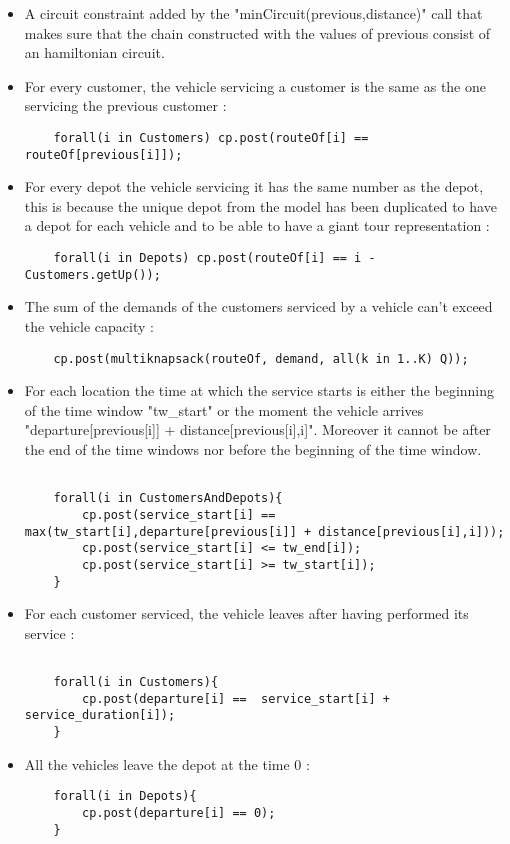 \documentclass{eplDoc}
\begin{document}
\begin{itemize}
	\item A circuit constraint added by the "minCircuit(previous,distance)" call that makes sure that the chain constructed with the values of previous consist of an hamiltonian circuit. 
	\item For every customer, the vehicle servicing a customer is the same as the one servicing the previous customer : 
	\begin{lstlisting}
	forall(i in Customers) cp.post(routeOf[i] == routeOf[previous[i]]);
	\end{lstlisting}
	\item For every depot the vehicle servicing it has the same number as the depot, this is because the unique depot from the model has been duplicated to have a depot for each vehicle and to be able to have a giant tour representation : 
	\begin{lstlisting}
	forall(i in Depots) cp.post(routeOf[i] == i - Customers.getUp());
	\end{lstlisting}
	\item The sum of the demands of the customers serviced by a vehicle can't exceed the vehicle capacity : 
	\begin{lstlisting}
	cp.post(multiknapsack(routeOf, demand, all(k in 1..K) Q));
	\end{lstlisting}
	\item For each location the time at which the service starts is either the beginning of the time window "tw\_start" or the moment the vehicle arrives "departure[previous[i]] + distance[previous[i],i]". Moreover it cannot be after the end of the time windows nor before the beginning of the time window. 
	\begin{lstlisting}
	
	forall(i in CustomersAndDepots){
		cp.post(service_start[i] == max(tw_start[i],departure[previous[i]] + distance[previous[i],i]));
		cp.post(service_start[i] <= tw_end[i]);
		cp.post(service_start[i] >= tw_start[i]);
	}
	\end{lstlisting}
	\item For each customer serviced, the vehicle leaves after having performed its service : 
	\begin{lstlisting}
	
	forall(i in Customers){
		cp.post(departure[i] ==  service_start[i] + service_duration[i]);
	}
	\end{lstlisting}
	\item All the vehicles leave the depot at the time 0 : 
	\begin{lstlisting}
	forall(i in Depots){
		cp.post(departure[i] == 0);
	}
	\end{lstlisting}

\end{itemize}
\end{document}
